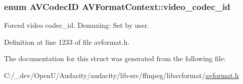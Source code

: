 \subsubsection[{\texorpdfstring{video\+\_\+codec\+\_\+id}{video_codec_id}}]{\setlength{\rightskip}{0pt plus 5cm}enum {\bf A\+V\+Codec\+ID} A\+V\+Format\+Context\+::video\+\_\+codec\+\_\+id}\hypertarget{struct_a_v_format_context_ab179ade0dbe905ab2867b7001bf618ec}{}\label{struct_a_v_format_context_ab179ade0dbe905ab2867b7001bf618ec}
Forced video codec\+\_\+id. Demuxing\+: Set by user. 

Definition at line 1233 of file avformat.\+h.



The documentation for this struct was generated from the following file\+:\begin{DoxyCompactItemize}
\item 
C\+:/\+\_\+dev/\+Open\+U/\+Audacity/audacity/lib-\/src/ffmpeg/libavformat/\hyperlink{avformat_8h}{avformat.\+h}\end{DoxyCompactItemize}
